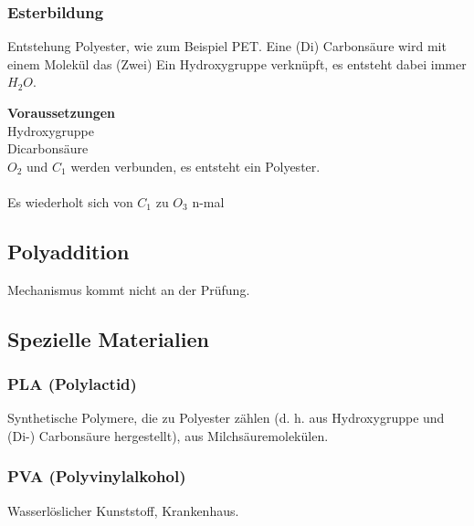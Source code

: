 \subsubsection{Esterbildung}

Entstehung Polyester, wie zum Beispiel PET. Eine (Di) Carbonsäure wird mit einem Molekül das (Zwei) Ein Hydroxygruppe verknüpft, es entsteht dabei immer $H_2O$.

\textbf{Voraussetzungen}\\


 Hydroxygruppe\\


 Dicarbonsäure\\

$O_2$ und $C_1$ werden verbunden, es entsteht ein Polyester.\\

\\

Es wiederholt sich von $C_1$ zu $O_3$ n-mal

\subsection{Polyaddition}

Mechanismus kommt nicht an der Prüfung.

\subsection{Spezielle Materialien}


\subsubsection{PLA (Polylactid)}

Synthetische Polymere, die zu Polyester zählen (d. h. aus Hydroxygruppe und (Di-) Carbonsäure hergestellt), aus Milchsäuremolekülen.

\subsubsection{PVA (Polyvinylalkohol)}

\begin{definition}[Bedeutung]
	Wasserlöslicher Kunststoff, Krankenhaus.
\end{definition}

